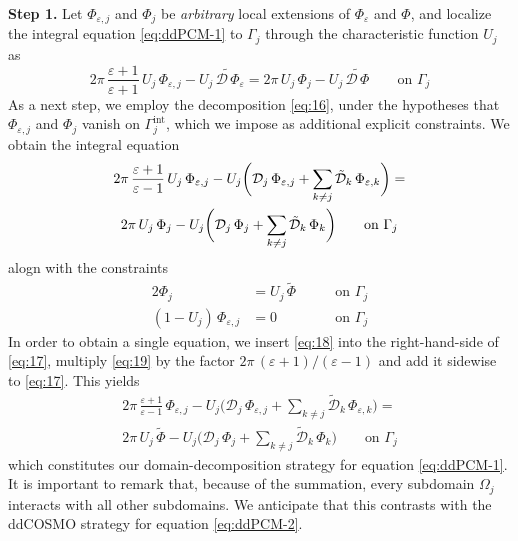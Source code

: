 {\bf Step 1.} 
Let $\Phi_{\varepsilon,j}$ and $\Phi_j$ be \emph{arbitrary} local extensions of $\Phi_\varepsilon$ and $\Phi$, and localize the integral equation \eqref{eq:ddPCM-1} to $\Gamma_j$ through the characteristic function $U_j$ as
\[
2 \pi \, \frac{\varepsilon + 1}{\varepsilon + 1} \, U_j \, \Phi_{\varepsilon,j} - U_j \, \widetilde{\mathcal{D} \, \Phi}_\varepsilon = 2 \pi \, U_j \, \Phi_j - U_j \, \widetilde{\mathcal{D} \, \Phi} \qquad \text{on }\Gamma_j
\]
As a next step, we employ the decomposition \eqref{eq:16}, under the hypotheses that $\Phi_{\varepsilon,j}$ and $\Phi_j$ vanish on $\Gamma_j^\text{int}$, which we impose as additional explicit constraints. We obtain the integral equation 
\begin{multline}\label{eq:17}
2\pi \, \frac{\varepsilon + 1}{\varepsilon - 1} \, U_j \, \Phi_{\varepsilon,j} - U_j \bigg( \mathcal{D}_j \, \Phi_{\varepsilon,j} + \sum_{k \ne j} \tilde{\mathcal{D}}_{k} \, \Phi_{\varepsilon,k}  \bigg) = \\ 2 \pi \, U_j \, \Phi_j - U_j \bigg( \mathcal{D}_j \, \Phi_j + \sum_{k \ne j} \tilde{\mathcal{D}}_{k} \, \Phi_{k}  \bigg) \qquad \text{on }\Gamma_j
\end{multline}
alogn with the constraints
\begin{alignat}{2}
\Phi_j & = U_j \, \widetilde{\Phi} \qquad & \text{on }\Gamma_j \label{eq:18}\\
(1 - U_j) \, \Phi_{\varepsilon,j} & = 0 &\text{on }\Gamma_j \label{eq:19}
\end{alignat}
In order to obtain a single equation, we insert \eqref{eq:18} into the right-hand-side of \eqref{eq:17}, multiply \eqref{eq:19} by the factor $2\pi \, (\varepsilon+1)/(\varepsilon-1)$ and add it sidewise to \eqref{eq:17}. This yields
\begin{multline}\label{eq:1}
2\pi \, \frac{\varepsilon + 1}{\varepsilon - 1} \, \Phi_{\varepsilon,j} - U_j \bigg( {\mathcal{D}}_j \, \Phi_{\varepsilon,j} + \sum_{k \ne j} \tilde{\mathcal{D}}_{k} \, \Phi_{\varepsilon,k}  \bigg) = \\ 2 \pi \, U_j \, \widetilde{\Phi} - U_j \bigg( {\mathcal{D}}_j \,\Phi_{j} + \sum_{k \ne j} \tilde{\mathcal{D}}_{k} \, \Phi_{k}  \bigg) \qquad \text{on }\Gamma_j
\end{multline}
which constitutes our domain-decomposition strategy for equation \eqref{eq:ddPCM-1}. It is important to remark that, because of the summation, every subdomain $\Omega_j$ interacts with all other subdomains. We anticipate that this contrasts with the ddCOSMO strategy for equation \eqref{eq:ddPCM-2}.

